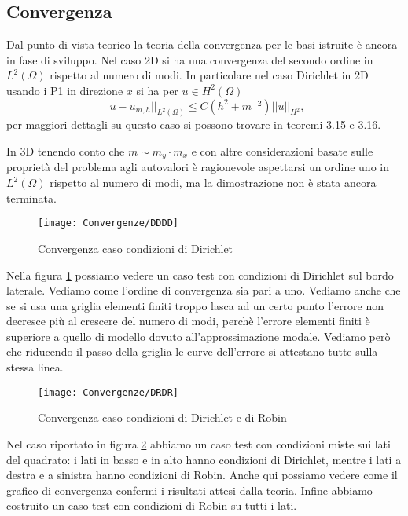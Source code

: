 \subsection*{Convergenza}
Dal punto di vista teorico la teoria della convergenza per le basi istruite \`e ancora in fase di sviluppo.
Nel caso 2D si ha una convergenza del secondo ordine in $L^2(\Omega)$ rispetto al numero di modi.
In particolare nel caso Dirichlet in 2D usando i P1 in direzione $x$ si ha per $u\in H^2(\Omega)$
\begin{equation}
 \label{eq:stimainl2}
 ||u-u_{m,h}||_{L^2(\Omega)}\leq C ( h^2+m^{-2}) ||u||_{H^2},
\end{equation}
per maggiori dettagli su questo caso si possono trovare in \cite{zilio:himod} teoremi 3.15 e 3.16.

In 3D tenendo conto che $m\sim m_y\cdot m_x$ e con altre considerazioni basate sulle propriet\`a del problema agli autovalori
\`e ragionevole aspettarsi un ordine uno in $L^2(\Omega)$ rispetto al numero di modi, ma la dimostrazione 
non \`e stata ancora terminata.

\begin{figure}[!h]
\centering
\texttt{[image: Convergenze/DDDD]}
\caption{Convergenza caso condizioni di Dirichlet}
\label{fig:ddddconv}
\end{figure}

Nella figura \ref{fig:ddddconv} possiamo vedere un caso test con condizioni di Dirichlet sul bordo laterale. Vediamo 
come l'ordine di convergenza sia pari a uno. Vediamo anche che se si usa una griglia elementi finiti troppo 
lasca ad un certo punto l'errore non decresce pi\`u al crescere del numero di modi, perch\`e 
l'errore elementi finiti \`e superiore a quello di modello dovuto all'approssimazione modale.
Vediamo per\`o che riducendo il passo della griglia le curve dell'errore si attestano tutte sulla stessa linea.

\begin{figure}[!h]
\centering
\texttt{[image: Convergenze/DRDR]}
\caption{Convergenza caso condizioni di Dirichlet e di Robin}
\label{fig:drdrconv}
\end{figure}

Nel caso riportato in figura \ref{fig:drdrconv} abbiamo un caso test con condizioni miste sui lati del quadrato:
i lati in basso e in alto hanno condizioni di Dirichlet, mentre i lati a destra e a sinistra hanno condizioni di Robin.
Anche qui possiamo vedere come il grafico di convergenza confermi i risultati attesi dalla teoria.
Infine abbiamo costruito un caso test con condizioni di Robin su tutti i lati. 


